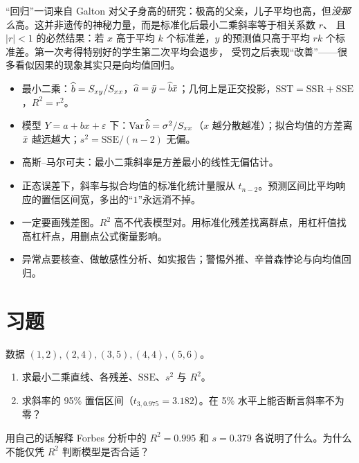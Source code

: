 \begin{deeper}[向均值回归]
“回归”一词来自 Galton 对父子身高的研究：极高的父亲，儿子平均也高，但\emph{没那么}高。这并非遗传的神秘力量，而是标准化后最小二乘斜率等于相关系数 $r$、
且 $|r|<1$ 的必然结果：若 $x$ 高于平均 $k$ 个标准差，$y$ 的预测值只高于平均 $rk$ 个标准差。第一次考得特别好的学生第二次平均会退步，
受罚之后表现“改善”——很多看似因果的现象其实只是向均值回归。
\end{deeper}

\begin{summary}
\begin{itemize}
\item 最小二乘：$\widehat{b}=S_{xy}/S_{xx}$，$\widehat{a}=\bar{y}-\widehat{b}\bar{x}$；几何上是正交投影，$\mathrm{SST}=\mathrm{SSR}+\mathrm{SSE}$，$R^2=r^2$。
\item 模型 $Y=a+bx+\varepsilon$ 下：$\operatorname{Var}\widehat{b}=\sigma^2/S_{xx}$（$x$ 越分散越准）；拟合均值的方差离 $\bar{x}$ 越远越大；$s^2=\mathrm{SSE}/(n-2)$ 无偏。
\item 高斯–马尔可夫：最小二乘斜率是方差最小的线性无偏估计。
\item 正态误差下，斜率与拟合均值的标准化统计量服从 $t_{n-2}$。预测区间比平均响应的置信区间宽，多出的“$1$”永远消不掉。
\item 一定要画残差图。$R^2$ 高不代表模型对。用标准化残差找离群点，用杠杆值找高杠杆点，用删点公式衡量影响。
\item 异常点要核查、做敏感性分析、如实报告；警惕外推、辛普森悖论与向均值回归。
\end{itemize}
\end{summary}

\section*{习题}

\levelA
\begin{exercise}
数据 $(1,2),(2,4),(3,5),(4,4),(5,6)$。
\begin{enumerate}
\item 求最小二乘直线、各残差、$\mathrm{SSE}$、$s^2$ 与 $R^2$。
\item 求斜率的 95\% 置信区间（$t_{3,0.975}=3.182$）。在 5\% 水平上能否断言斜率不为零？
\end{enumerate}
\end{exercise}

\begin{exercise}
用自己的话解释 Forbes 分析中的 $R^2=0.995$ 和 $s=0.379$ 各说明了什么。为什么不能仅凭 $R^2$ 判断模型是否合适？
\end{exercise}

